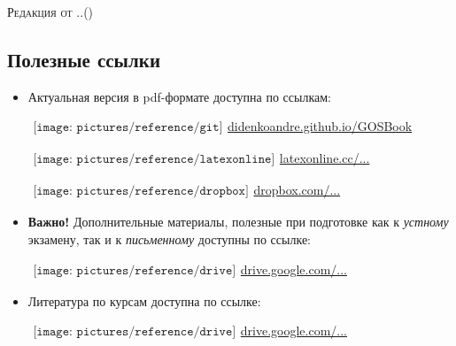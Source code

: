 {\LARGE\scshape Редакция от \twodigit\day.\twodigit\month.\the\year \;(\currenttime)}\par 

\vspace*{-1\baselineskip}  
\begin{flushleft}
\section*{\Large Полезные ссылки}
\begin{itemize}[wide, labelwidth=!, labelindent=0pt, label=$\blacktriangleright$, noitemsep]
\item Актуальная версия в pdf-формате доступна по ссылкам:

\qquad\href{https://didenkoandre.github.io/GOSBook}{$
\begin{array}{l}
\texttt{[image: pictures/reference/git]}
\end{array}
$\large didenkoandre.github.io/GOSBook}

\qquad\href{http://latexonline.cc/compile?git=https://github.com/DidenkoAndre/GOSBook&target=GOSBook.tex&download=GOSBook.pdf&command=pdflatex}{$
\begin{array}{l}
\texttt{[image: pictures/reference/latexonline]}
\end{array}
$\large latexonline.cc/...}

\qquad\href{https://www.dropbox.com/sh/7e5mfj8q68o2ipp/AAD8XvpZhiJzFbEh_IeH305ia?dl=0&preview=GOSBook.pdf}{$
\begin{array}{l}
\texttt{[image: pictures/reference/dropbox]}
\end{array}
$\large dropbox.com/...}

\item \textbf{Важно!} Дополнительные материалы, полезные при подготовке как к \textit{устному} экзамену, так и к \textit{письменному} доступны по ссылке:

\qquad\href{https://drive.google.com/drive/u/0/folders/0BzuzEyNkpwYDYjVNcE0wa3hqWjA}{$
\begin{array}{l}
\texttt{[image: pictures/reference/drive]}
\end{array}
$\large drive.google.com/...}

\item Литература по курсам доступна по ссылке:

\qquad\href{https://drive.google.com/drive/u/0/folders/0BzuzEyNkpwYDcENXcV9jNWdwVlU}{$
\begin{array}{l}
\texttt{[image: pictures/reference/drive]}
\end{array}
$\large drive.google.com/...}


\end{itemize}
\end{flushleft}
